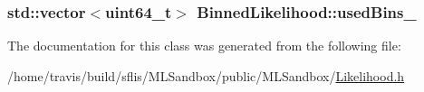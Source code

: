 \hypertarget{classBinnedLikelihood_a4a044760c26d09a93ae8c6a18d44ad88}{
\subsubsection[{used\-Bins\-\_\-}]{\setlength{\rightskip}{0pt plus 5cm}std\-::vector$<$uint64\-\_\-t$>$ Binned\-Likelihood\-::used\-Bins\-\_\-\hspace{0.3cm}{\ttfamily [protected]}}}\label{classBinnedLikelihood_a4a044760c26d09a93ae8c6a18d44ad88}


The documentation for this class was generated from the following file\-:\begin{DoxyCompactItemize}
\item 
/home/travis/build/sflis/\-M\-L\-Sandbox/public/\-M\-L\-Sandbox/\hyperlink{Likelihood_8h}{Likelihood.\-h}\end{DoxyCompactItemize}
